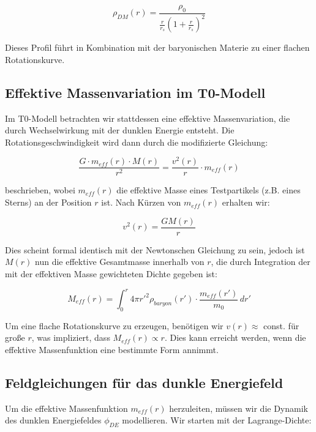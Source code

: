 \documentclass[a4paper,12pt]{article}
\begin{document}
	\begin{equation}
		\rho_{DM}(r) = \frac{\rho_0}{\frac{r}{r_s}\left(1 + \frac{r}{r_s}\right)^2}
	\end{equation}
	
	Dieses Profil führt in Kombination mit der baryonischen Materie zu einer flachen Rotationskurve.
	
	\subsection{Effektive Massenvariation im T0-Modell}
	
	Im T0-Modell betrachten wir stattdessen eine effektive Massenvariation, die durch Wechselwirkung mit der dunklen Energie entsteht. Die Rotationsgeschwindigkeit wird dann durch die modifizierte Gleichung:
	
	\begin{equation}
		\frac{G \cdot m_{eff}(r) \cdot M(r)}{r^2} = \frac{v^2(r)}{r} \cdot m_{eff}(r)
	\end{equation}
	
	beschrieben, wobei $m_{eff}(r)$ die effektive Masse eines Testpartikels (z.B. eines Sterns) an der Position $r$ ist. Nach Kürzen von $m_{eff}(r)$ erhalten wir:
	
	\begin{equation}
		v^2(r) = \frac{GM(r)}{r}
	\end{equation}
	
	Dies scheint formal identisch mit der Newtonschen Gleichung zu sein, jedoch ist $M(r)$ nun die effektive Gesamtmasse innerhalb von $r$, die durch Integration der mit der effektiven Masse gewichteten Dichte gegeben ist:
	
	\begin{equation}
		M_{eff}(r) = \int_0^r 4\pi r'^2 \rho_{baryon}(r') \cdot \frac{m_{eff}(r')}{m_0} \, dr'
	\end{equation}
	
	Um eine flache Rotationskurve zu erzeugen, benötigen wir $v(r) \approx$ const. für große $r$, was impliziert, dass $M_{eff}(r) \propto r$. Dies kann erreicht werden, wenn die effektive Massenfunktion eine bestimmte Form annimmt.
	
	\subsection{Feldgleichungen für das dunkle Energiefeld}
	
	Um die effektive Massenfunktion $m_{eff}(r)$ herzuleiten, müssen wir die Dynamik des dunklen Energiefeldes $\phi_{DE}$ modellieren. Wir starten mit der Lagrange-Dichte:
	
\end{document}
